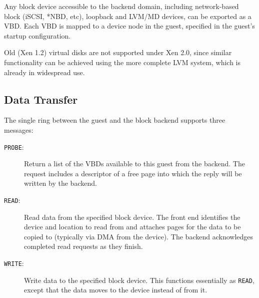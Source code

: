 Any block device accessible to the backend domain, including
network-based block (iSCSI, *NBD, etc), loopback and LVM/MD devices,
can be exported as a VBD.  Each VBD is mapped to a device node in the
guest, specified in the guest's startup configuration.

Old (Xen 1.2) virtual disks are not supported under Xen 2.0, since
similar functionality can be achieved using the more complete LVM
system, which is already in widespread use.

\subsection{Data Transfer}

The single ring between the guest and the block backend supports three
messages:

\begin{description}
\item [{\small {\tt PROBE}}:] Return a list of the VBDs available to
  this guest from the backend.  The request includes a descriptor of a
  free page into which the reply will be written by the backend.

\item [{\small {\tt READ}}:] Read data from the specified block
  device.  The front end identifies the device and location to read
  from and attaches pages for the data to be copied to (typically via
  DMA from the device).  The backend acknowledges completed read
  requests as they finish.

\item [{\small {\tt WRITE}}:] Write data to the specified block
  device.  This functions essentially as {\small {\tt READ}}, except
  that the data moves to the device instead of from it.
\end{description}


